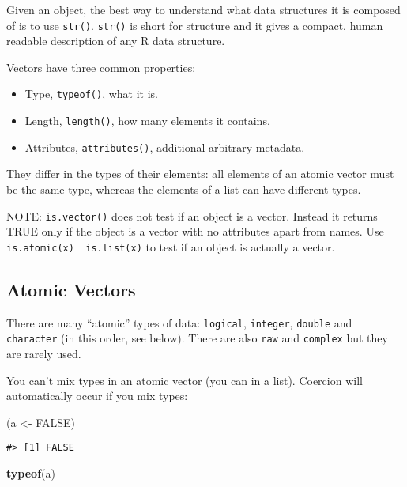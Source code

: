 \documentclass[]{book}
\newenvironment{Shaded}{\begin{snugshade}}{\end{snugshade}}
\newcommand{\KeywordTok}[1]{\textcolor[rgb]{0.13,0.29,0.53}{\textbf{#1}}}
\newcommand{\StringTok}[1]{\textcolor[rgb]{0.31,0.60,0.02}{#1}}
\newcommand{\OtherTok}[1]{\textcolor[rgb]{0.56,0.35,0.01}{#1}}
\newcommand{\NormalTok}[1]{#1}
\providecommand{\tightlist}{%
  \setlength{\itemsep}{0pt}\setlength{\parskip}{0pt}}
\theoremstyle{definition}
\theoremstyle{definition}
\theoremstyle{definition}
\theoremstyle{remark}
\begin{document}
Given an object, the best way to understand what data structures it is
composed of is to use \texttt{str()}. \texttt{str()} is short for
structure and it gives a compact, human readable description of any R
data structure.

Vectors have three common properties:

\begin{itemize}
\tightlist
\item
  Type, \texttt{typeof()}, what it is.
\item
  Length, \texttt{length()}, how many elements it contains.
\item
  Attributes, \texttt{attributes()}, additional arbitrary metadata.
\end{itemize}

They differ in the types of their elements: all elements of an atomic
vector must be the same type, whereas the elements of a list can have
different types.

NOTE: \texttt{is.vector()} does not test if an object is a vector.
Instead it returns TRUE only if the object is a vector with no
attributes apart from names. Use
\texttt{is.atomic(x)\ \textbar{}\textbar{}\ is.list(x)} to test if an
object is actually a vector.

\subsection{Atomic Vectors}\label{atomic-vectors}

There are many ``atomic'' types of data: \texttt{logical},
\texttt{integer}, \texttt{double} and \texttt{character} (in this order,
see below). There are also \texttt{raw} and \texttt{complex} but they
are rarely used.

You can't mix types in an atomic vector (you can in a list). Coercion
will automatically occur if you mix types:

\begin{Shaded}
\begin{Highlighting}[]
\NormalTok{(a <-}\StringTok{ }\OtherTok{FALSE}\NormalTok{)}
\end{Highlighting}
\end{Shaded}

\begin{verbatim}
#> [1] FALSE
\end{verbatim}

\begin{Shaded}
\begin{Highlighting}[]
\KeywordTok{typeof}\NormalTok{(a)}
\end{Highlighting}
\end{Shaded}
\end{document}
